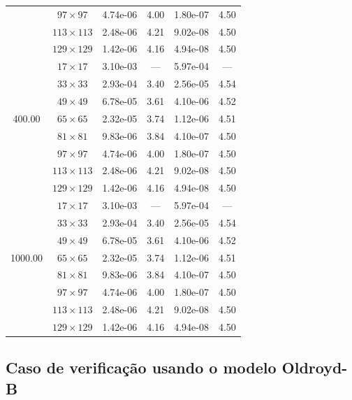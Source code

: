 \begin{table}[H]
{\begin{tabular*}{\textwidth}{@{\extracolsep\fill}c|c|cc|cc@{}}
                    & $97\times 97$ & 4.74e-06 & 4.00 & 1.80e-07 & 4.50\\
                    & $113\times 113$ & 2.48e-06 & 4.21 & 9.02e-08 & 4.50\\
                    & $129\times 129$ & 1.42e-06 & 4.16 & 4.94e-08 & 4.50\\
                    \midrule
                    \multirow{7}{*}{400.00} & $17\times 17$ & 3.10e-03 & --- & 5.97e-04 & ---\\
                    & $33\times 33$ & 2.93e-04 & 3.40 & 2.56e-05 & 4.54\\
                    & $49\times 49$ & 6.78e-05 & 3.61 & 4.10e-06 & 4.52\\
                    & $65\times 65$ & 2.32e-05 & 3.74 & 1.12e-06 & 4.51\\
                    & $81\times 81$ & 9.83e-06 & 3.84 & 4.10e-07 & 4.50\\
                    & $97\times 97$ & 4.74e-06 & 4.00 & 1.80e-07 & 4.50\\
                    & $113\times 113$ & 2.48e-06 & 4.21 & 9.02e-08 & 4.50\\
                    & $129\times 129$ & 1.42e-06 & 4.16 & 4.94e-08 & 4.50\\
                    \midrule
                    \multirow{7}{*}{1000.00} & $17\times 17$ & 3.10e-03 & --- & 5.97e-04 & ---\\
                    & $33\times 33$ & 2.93e-04 & 3.40 & 2.56e-05 & 4.54\\
                    & $49\times 49$ & 6.78e-05 & 3.61 & 4.10e-06 & 4.52\\
                    & $65\times 65$ & 2.32e-05 & 3.74 & 1.12e-06 & 4.51\\
                    & $81\times 81$ & 9.83e-06 & 3.84 & 4.10e-07 & 4.50\\
                    & $97\times 97$ & 4.74e-06 & 4.00 & 1.80e-07 & 4.50\\
                    & $113\times 113$ & 2.48e-06 & 4.21 & 9.02e-08 & 4.50\\
                    & $129\times 129$ & 1.42e-06 & 4.16 & 4.94e-08 & 4.50\\
                    \bottomrule
                \end{tabular*}
		}{
		\fdadospesquisa
	}
\end{table}

\subsection{Caso de verificação usando o modelo Oldroyd-B}

